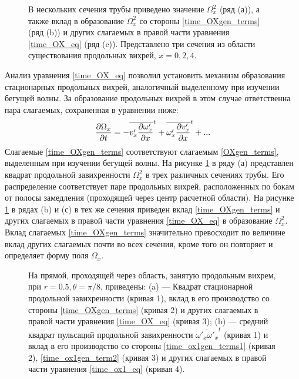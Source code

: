 \begin{figure}[h]
\caption{В нескольких сечения трубы приведено значение $\Omega_x^2$ (ряд (а)), а также вклад в образование $\Omega_x^2$ со стороны \eqref{time_OXgen_terms} (ряд (b)) и других слагаемых в правой части уравнения \eqref{time_OX_eq} (ряд (c)). Представлено три сечения из области существования продольных вихрей, $x=0,2,4$.}
\label{mp_OXgen_pic}
\end{figure}

Анализ уравнения \eqref{time_OX_eq} позволил установить механизм образования стационарных продольных вихрей, аналогичный выделенному при изучении бегущей волны. За образование продольных вихрей в этом случае ответственна пара слагаемых, сохраненная в уравнении ниже: 
\begin{equation} \label{time_OXgen_terms}
\frac{\partial \Omega_x}{\partial t} = - \overline{v'_x \frac{\partial \omega'_x}{\partial x}}^t + \overline{\omega'_x \frac{\partial v'_x}{\partial x}}^t + ... 
\end{equation}
Слагаемые \eqref{time_OXgen_terms} соответствуют слагаемым \eqref{OXgen_terms}, выделенным при изучении бегущей волны. На рисунке \ref{mp_OXgen_pic} в ряду (а) представлен квадрат продольной завихренности $\Omega_x^2$ в трех различных сечениях трубы. Его распределение соответствует паре продольных вихрей, расположенных по бокам от полосы замедления (проходящей через центр расчетной области). На рисунке \ref{mp_OXgen_pic} в рядах (b) и (с) в тех же сечения приведен вклад \eqref{time_OXgen_terms} и других слагаемых в правой части уравнения \eqref{time_OX_eq} в образование $\Omega_x^2$. Вклад слагаемых \eqref{time_OXgen_terms} значительно превосходит по величине вклад других слагаемых почти во всех сечения, кроме того он повторяет и определяет форму поля $\Omega_x$. 

\begin{figure}
\caption{На прямой, проходящей через область, занятую продольным вихрем, при $r = 0.5, \theta = \pi/8$, приведены: (a) --- Квадрат стационарной продольной завихренности (кривая 1), вклад в его производство со стороны \eqref{time_OXgen_terms} (кривая  2) и других слагаемых в правой части уравнения \eqref{time_OX_eq} (кривая 3); (b) --- средний квадрат пульсаций продольной завихренности $\overline{\omega'_x \omega'_x}^t$ (кривая 1) и вклад в его производство со стороны \eqref{time_ox1gen_terms1} (кривая  2), \eqref{time_ox1gen_term2} (кривая  3) и других слагаемых в правой части уравнения \eqref{time_ox1_eq} (кривая  4).}
\label{xline_oxgen_pic}
\end{figure}

